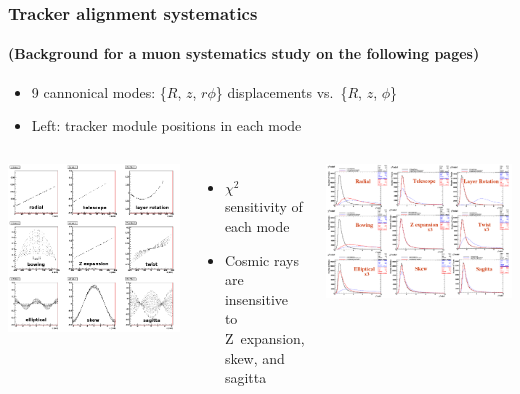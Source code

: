 \documentclass[compress]{beamer}
\begin{document}
\begin{frame}
\frametitle{Tracker alignment systematics}
\framesubtitle{(Background for a muon systematics study on the following pages)}

\begin{itemize}
\item 9 cannonical modes: \{$R$, $z$, $r\phi$\} displacements vs.\ \{$R$, $z$, $\phi$\}
\item Left: tracker module positions in each mode
\end{itemize}

\begin{columns}
\includegraphics[width=\linewidth]{TrackerSystematics.png}
\begin{itemize}
\item $\chi^2$ sensitivity of each mode
\item Cosmic rays are insensitive to \mbox{Z expansion}, skew, and sagitta
\end{itemize}

\includegraphics[width=\linewidth]{chi2_sensitivity.png}
\end{columns}
\end{frame}
\end{document}
